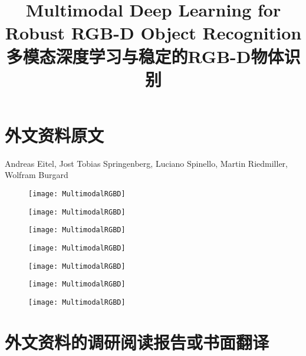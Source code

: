 \chapter{外文资料原文}
\label{cha:engorg}

\title{Multimodal Deep Learning for Robust RGB-D Object Recognition}
\begin{center}
{\footnotesize Andreas Eitel, Jost Tobias Springenberg, Luciano Spinello, Martin Riedmiller, Wolfram Burgard}
\end{center}

\begin{figure}[ht]
   \centering
     \texttt{[image: MultimodalRGBD]}
\end{figure}


\begin{figure}[ht]
   \centering
     \texttt{[image: MultimodalRGBD]}
\end{figure}

\begin{figure}[ht]
   \centering
     \texttt{[image: MultimodalRGBD]}
\end{figure}

\begin{figure}[ht]
   \centering
     \texttt{[image: MultimodalRGBD]}
\end{figure}

\begin{figure}[ht]
   \centering
     \texttt{[image: MultimodalRGBD]}
\end{figure}

\begin{figure}[ht]
   \centering
     \texttt{[image: MultimodalRGBD]}
\end{figure}

\begin{figure}[ht]
   \centering
     \texttt{[image: MultimodalRGBD]}
\end{figure}

\chapter{外文资料的调研阅读报告或书面翻译}

\title{\heiti 多模态深度学习与稳定的RGB-D物体识别}

